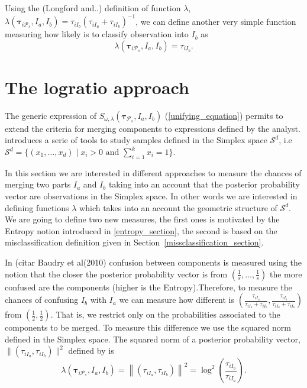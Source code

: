 \documentclass[10pt, a4paper]{article}
\newcommand{\m}[1]{\boldsymbol{#1}}
\begin{document}
\begin{spacing}{1.9}
Using the (Longford and..) definition of function $\lambda$, $\lambda(\m\tau_{i \mathcal{P}_s},  I_a,  I_b) = \tau_{iI_b} (\tau_{iI_a} + \tau_{iI_b})^{-1}$, we can define another very simple function measuring how likely is to classify observation into $I_b$ as
\[
\lambda(\m\tau_{i \mathcal{P}_s},  I_a,  I_b) = \tau_{iI_b}.
\]

\section{The logratio approach}\label{logratio_section}

The generic expression of $S_{\omega, \lambda}( \m\tau_{\mathcal{P}_s},  I_a,  I_b)$ (\ref{unifying_equation}) permits to extend the criteria for merging components to expressions defined by the analyst. \cite{aitchison1986statistical} introduces a serie of tools to study samples defined in the Simplex space $\mathcal{S}^d$, i.e $\mathcal{S}^d = \{ (x_1,\dots, x_d) \;|\; x_i > 0 \text{ and } \sum_{i=1}^k x_i = 1 \}$. 

In this section we are interested in different approaches to measure the chances of merging two parts $I_a$ and $I_b$ taking into an account that the posterior probability vector are observations in the Simplex space. In other words we are interested in defining functions $\lambda$ which takes into an account the geometric structure of $\mathcal{S}^d$. We are going to define two new measures, the first ones is motivated by the Entropy notion introduced in \ref{entropy_section}, the second is based on the misclassification definition given in Section~\ref{missclassification_section}.


In (citar Baudry et al(2010) confusion between components is measured using the notion that the closer the posterior probability vector is from $(\frac{1}{s}, \dots, \frac{1}{s})$ the more confused are the components (higher is the Entropy).Therefore, to measure the chances of confusing $I_b$ with $I_a$ we can measure how different is $(\frac{\tau_{i I_a}}{\tau_{i I_a} +\tau_{i I_b}}, \frac{\tau_{i I_b}}{\tau_{i I_a} + \tau_{i I_b}})$ from $(\frac{1}{2}, \frac{1}{2})$. That is, we restrict only on the probabilities associated to the components to be merged. To measure this difference we use the squared norm defined in the Simplex space. The squared norm of a posterior probability vector, $\| (\tau_{iI_a}, \tau_{iI_b}) \|^2$  defined by \cite{aitchison2002simplicial} is 
\[
\lambda(\m\tau_{i \mathcal{P}_s},  I_a,  I_b) = \left\| (\tau_{iI_a}, \tau_{iI_b}) \right\|^2 = \log^2 \left(\frac{ \tau_{iI_b} }{ \tau_{iI_a} }\right).
\]



\end{spacing}
\end{document}
